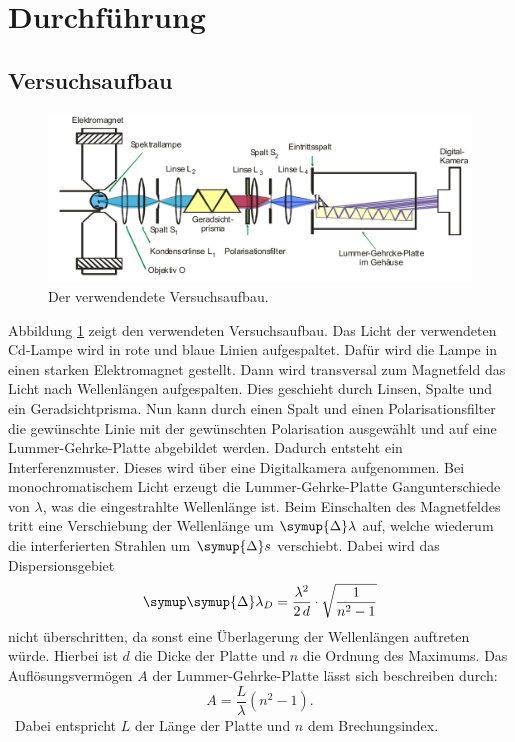 \documentclass[
  bibliography=totoc,     %
  captions=tableheading,  %
  titlepage=firstiscover, %
]{scrartcl}
\begin{document}
\section{Durchführung}
\subsection{Versuchsaufbau}
\begin{figure}
  \centering
  \includegraphics[scale=0.39]{aufbau.png}
  \caption{Der verwendendete Versuchsaufbau.}
  \label{fig:3}
\end{figure}
Abbildung \ref{fig:3} zeigt den verwendeten Versuchsaufbau. Das Licht der
verwendeten Cd-Lampe wird in rote und blaue Linien aufgespaltet. Dafür wird die
Lampe in einen starken Elektromagnet gestellt. Dann
wird transversal zum Magnetfeld das Licht nach Wellenlängen aufgespalten. Dies
geschieht durch Linsen, Spalte und ein Geradsichtprisma. Nun kann durch einen
Spalt und einen Polarisationsfilter die gewünschte Linie mit der gewünschten
Polarisation ausgewählt und auf eine Lummer-Gehrke-Platte abgebildet werden.
Dadurch entsteht ein Interferenzmuster. Dieses wird über eine Digitalkamera
aufgenommen. Bei monochromatischem Licht erzeugt die Lummer-Gehrke-Platte
Gangunterschiede von $\lambda$, was die eingestrahlte Wellenlänge ist. Beim
Einschalten des Magnetfeldes tritt eine Verschiebung der Wellenlänge um
$\symup{\Delta} \lambda$ auf, welche wiederum die interferierten Strahlen
um $\symup{\Delta} s$ verschiebt. Dabei wird das Dispersionsgebiet
\begin{equation}
    \symup \symup{\Delta} \lambda_D = \frac{\lambda^2}{2\, d} \cdot \sqrt{\frac{1}{n^2 - 1}}
    \label{eqn:11}
\end{equation}
nicht überschritten, da sonst eine Überlagerung der Wellenlängen auftreten würde.
Hierbei ist $d$ die Dicke der Platte und $n$ die Ordnung des Maximums. Das
Auflösungsvermögen $A$ der Lummer-Gehrke-Platte lässt sich beschreiben durch:
\begin{equation}
  A = \frac{L}{\lambda} (n^2 - 1).
  \label{eqn:12}
\end{equation}\
Dabei entspricht $L$ der Länge der Platte und $n$ dem Brechungsindex.
\end{document}
